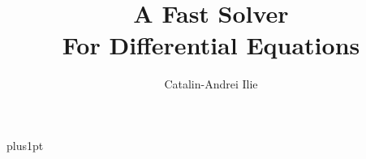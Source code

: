\documentclass[12pt]{ociamthesis}  %
\title{A Fast Solver\\[1ex]     %
        For Differential Equations}   %
\author{Catalin-Andrei Ilie}             %
\begin{document}
\baselineskip=18pt plus1pt

\setcounter{secnumdepth}{3}
\setcounter{tocdepth}{3}


\maketitle                  %

\begin{romanpages}          %
\tableofcontents            %
\end{romanpages}            %








% 
% 



\end{document}

